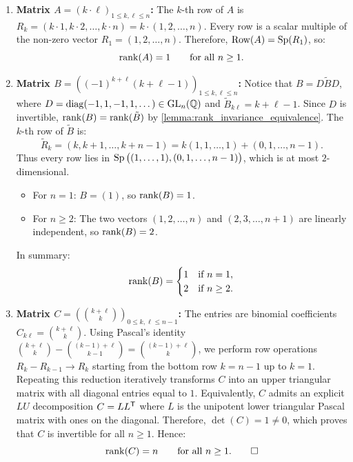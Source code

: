 \begin{exercisesolution*}
\label{sol:ranks_parametric_families_rational_matrices}
\begin{enumerate}[label=\textbf{(\alph*)}]
    \item \textbf{Matrix $A = (k \cdot \ell)_{1 \le k, \ell \le n}$:}
    The $k$-th row of $A$ is $R_k = (k \cdot 1, k \cdot 2, \dots, k \cdot n) = k \cdot (1, 2, \dots, n)$.
    Every row is a scalar multiple of the non-zero vector $R_1 = (1, 2, \dots, n)$.
    Therefore, $\operatorname{Row}(A) = \operatorname{Sp}(R_1)$, so:
    \[
    \operatorname{rank}(A) = 1 \qquad \text{for all } n \ge 1.
    \]

    \item \textbf{Matrix $B = \left((-1)^{k+\ell}(k + \ell - 1)\right)_{1 \le k, \ell \le n}$:}
    Notice that $B = D \tilde{B} D$, where $D = \operatorname{diag}(-1, 1, -1, 1, \dots) \in \operatorname{GL}_n(\mathbb{Q})$ and $\tilde{B}_{k\ell} = k + \ell - 1$.
    Since $D$ is invertible, $\operatorname{rank}(B) = \operatorname{rank}(\tilde{B})$ by \cref{lemma:rank_invariance_equivalence}.
    The $k$-th row of $\tilde{B}$ is:
    \[
    \tilde{R}_k = (k, k+1, \dots, k+n-1) = k (1, 1, \dots, 1) + (0, 1, \dots, n-1).
    \]
    Thus every row lies in $\operatorname{Sp}\big((1, \dots, 1), (0, 1, \dots, n-1)\big)$, which is at most $2$-dimensional.
    \begin{itemize}
        \item For $n = 1$: $B = (1)$, so $\operatorname{rank}(B) = 1$.
        \item For $n \ge 2$: The two vectors $(1, 2, \dots, n)$ and $(2, 3, \dots, n+1)$ are linearly independent, so $\operatorname{rank}(B) = 2$.
    \end{itemize}
    In summary:
    \[
    \operatorname{rank}(B) = \begin{cases} 1 & \text{if } n = 1, \\ 2 & \text{if } n \ge 2. \end{cases}
    \]

    \item \textbf{Matrix $C = \left(\binom{k+\ell}{k}\right)_{0 \le k, \ell \le n-1}$:}
    The entries are binomial coefficients $C_{k\ell} = \binom{k+\ell}{k}$.
    Using Pascal's identity $\binom{k+\ell}{k} - \binom{(k-1)+\ell}{k-1} = \binom{(k-1)+\ell}{k}$, we perform row operations $R_k - R_{k-1} \to R_k$ starting from the bottom row $k = n-1$ up to $k = 1$.
    Repeating this reduction iteratively transforms $C$ into an upper triangular matrix with all diagonal entries equal to $1$.
    Equivalently, $C$ admits an explicit $L U$ decomposition $C = L L^{\mathsf{T}}$ where $L$ is the unipotent lower triangular Pascal matrix with ones on the diagonal.
    Therefore, $\det(C) = 1 \ne 0$, which proves that $C$ is invertible for all $n \ge 1$.
    Hence:
    \[
    \operatorname{rank}(C) = n \qquad \text{for all } n \ge 1. \qedhere
    \]
\end{enumerate}
\end{exercisesolution*}
